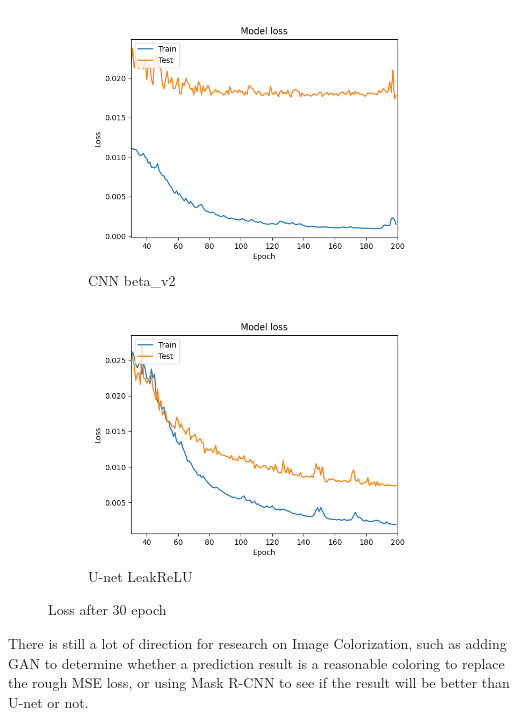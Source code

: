 \documentclass[10pt,twocolumn,letterpaper]{article}
\begin{document}
\begin{figure}[H]
  \centering
  \begin{subfigure}[b]{0.45\linewidth}
    \includegraphics[width=\linewidth]{fig9}
     \caption{CNN beta\_v2}
  \end{subfigure}
  \begin{subfigure}[b]{0.45\linewidth}
    \includegraphics[width=\linewidth]{fig6}
    \caption{U-net LeakReLU}
  \end{subfigure}
  \caption{Loss after 30 epoch}
\end{figure}

There is still a lot of direction for research on Image Colorization, such as adding GAN to determine whether a prediction result is a reasonable coloring to replace the rough MSE loss, or using Mask R-CNN to see if the result will be better than U-net or not. 
\end{document}
